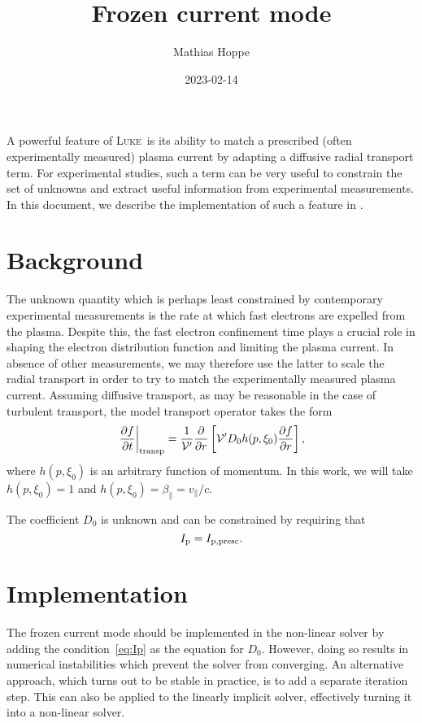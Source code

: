 \documentclass{notes}
\title{Frozen current mode}
\author{Mathias Hoppe}
\date{2023-02-14}
\newcommand{\LUKE}{\textsc{Luke}}
\newcommand{\Vp}{\mathcal{V}'}
\begin{document}
	\maketitle

	A powerful feature of \LUKE\ is its ability to match a prescribed (often
	experimentally measured) plasma current by adapting a diffusive radial
	transport term. For experimental studies, such a term can be very useful
	to constrain the set of unknowns and extract useful information from
	experimental measurements. In this document, we describe the implementation
	of such a feature in \DREAM.

	\tableofcontents

	\section{Background}
	The unknown quantity which is perhaps least constrained by contemporary
	experimental measurements is the rate at which fast electrons are expelled
	from the plasma. Despite this, the fast electron confinement time plays a
	crucial role in shaping the electron distribution function and limiting the
	plasma current. In absence of other measurements, we may therefore use the
	latter to scale the radial transport in order to try to match the
	experimentally measured plasma current. Assuming diffusive transport, as
	may be reasonable in the case of turbulent transport, the model transport
	operator takes the form
	\begin{equation}\label{eq:transp}
		\left.\frac{\partial f}{\partial t}\right|_{\rm transp} =
			\frac{1}{\Vp}\frac{\partial}{\partial r}\left[
				\Vp D_0h(p,\xi_0)\frac{\partial f}{\partial r}
			\right],
	\end{equation}
	where $h(p,\xi_0)$ is an arbitrary function of momentum. In this work, we
	will take $h(p,\xi_0)=1$ and $h(p,\xi_0)=\beta_\parallel=v_\parallel/c$.

	The coefficient $D_0$ is unknown and can be constrained by requiring that
	\begin{equation}\label{eq:Ip}
		I_{\rm p} = I_{\rm p,presc}.
	\end{equation}

	\section{Implementation}
	The frozen current mode should be implemented in the non-linear solver by
	adding the condition~\eqref{eq:Ip} as the equation for $D_0$. However, doing
	so results in numerical instabilities which prevent the solver from
	converging. An alternative approach, which turns out to be stable in
	practice, is to add a separate iteration step. This can also be applied to
	the linearly implicit solver, effectively turning it into a non-linear
	solver.
\end{document}

